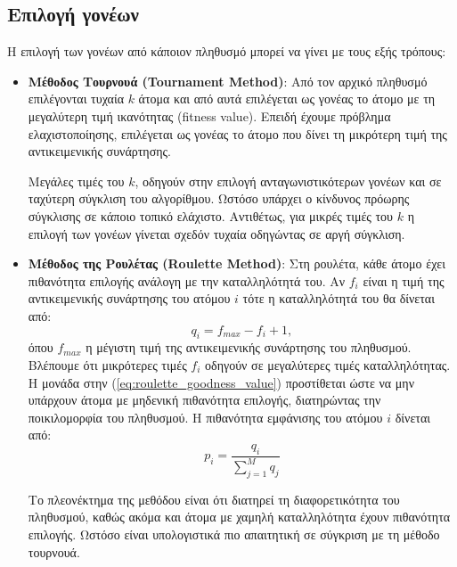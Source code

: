 \documentclass[a4paper,12pt]{article}
\begin{document}
\subsection{Επιλογή γονέων}
Η επιλογή των γονέων από κάποιον πληθυσμό μπορεί να γίνει με τους εξής τρόπους:
\begin{itemize}
    \item \textbf{Μέθοδος Τουρνουά (Tournament Method)}:
    Από τον αρχικό πληθυσμό επιλέγονται τυχαία $k$ άτομα και από αυτά επιλέγεται ως γονέας το άτομο
    με τη μεγαλύτερη τιμή ικανότητας (fitness value).
    Επειδή έχουμε πρόβλημα ελαχιστοποίησης, επιλέγεται ως γονέας το άτομο που δίνει τη μικρότερη τιμή
    της αντικειμενικής συνάρτησης. 
    
    Μεγάλες τιμές του $k$, οδηγούν στην επιλογή ανταγωνιστικότερων γονέων
    και σε ταχύτερη σύγκλιση του αλγορίθμου. Ωστόσο υπάρχει ο κίνδυνος πρόωρης σύγκλισης σε κάποιο τοπικό
    ελάχιστο. Αντιθέτως, για μικρές τιμές του $k$ η επιλογή των γονέων γίνεται σχεδόν τυχαία οδηγώντας σε 
    αργή σύγκλιση.

    \item \textbf{Μέθοδος της Ρουλέτας (Roulette Method)}:
    Στη ρουλέτα, κάθε άτομο έχει πιθανότητα επιλογής ανάλογη με την καταλληλότητά του. Αν $f_i$ είναι η
    τιμή της αντικειμενικής συνάρτησης του ατόμου $i$ τότε η καταλληλότητά του θα δίνεται από:
    \begin{equation}
        q_i = f_{max} - f_i + 1,
        \label{eq:roulette_goodness_value}
    \end{equation}
    όπου $f_{max}$ η μέγιστη τιμή της αντικειμενικής συνάρτησης του πληθυσμού. Βλέπουμε ότι μικρότερες τιμές
    $f_i$ οδηγούν σε μεγαλύτερες τιμές καταλληλότητας. Η μονάδα στην (\ref{eq:roulette_goodness_value}) προστίθεται
    ώστε να μην υπάρχουν άτομα με μηδενική πιθανότητα επιλογής, διατηρώντας την ποικιλομορφία του πληθυσμού.
    Η πιθανότητα εμφάνισης του ατόμου $i$ δίνεται από:
    \begin{equation}
        p_i = \frac{q_i}{\sum_{j=1}^{M}q_j}
        \label{eq:roulette_selection_probability}
    \end{equation}

    Το πλεονέκτημα της μεθόδου είναι ότι διατηρεί τη διαφορετικότητα του πληθυσμού, καθώς ακόμα και άτομα με χαμηλή 
    καταλληλότητα έχουν πιθανότητα επιλογής. Ωστόσο είναι υπολογιστικά πιο απαιτητική σε σύγκριση με τη μέθοδο τουρνουά.


\end{itemize}
\end{document}

